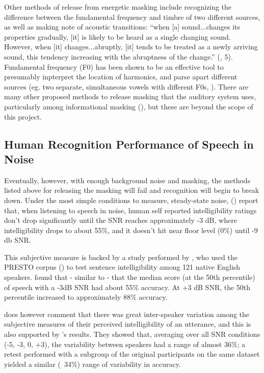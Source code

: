 \documentclass[dissertation,copyright]{uathesis}
\begin{document}
Other methods of release from energetic masking include recognizing the difference between the fundamental frequency and timbre of two different sources, as well as making note of acoustic transitions: ``when [a] sound...changes its properties gradually, [it] is likely to be heard as a single changing sound.  However, when [it] changes...abruptly, [it] tends to be treated as a newly arriving sound, this tendency increasing with the abruptness of the change.'' (\cite{bregman:94}, 5).  Fundamental frequency (F0) has been shown to be an effective tool to presumably inpterpret the location of harmonics, and parse apart different sources (eg. two separate, simultaneous vowels with different F0s, \cite{bird:98}). There are many other proposed methods to release masking that the auditory system uses, particularly among informational masking (\cite{middlebrooks:17}), but these are beyond the scope of this project.


\subsection{Human Recognition Performance of Speech in Noise}

Eventually, however, with enough background noise and masking, the methods listed above for releasing the masking will fail and recognition will begin to break down.  Under the most simple conditions to measure, steady-state noise, (\cite{ding:13}) report that, when listening to speech in noise, human self reported intelligibility ratings don't drop significantly until the SNR reaches approximately -3 dB, where intelligibility drops to about 55\%, and it doesn't hit near floor level (0\%) until -9 db SNR.

This subjective measure is backed by a study performed by \cite{gilbert:13}, who used the PRESTO corpus (\cite{garofolo:93}) to test sentence intelligibility among 121 native English speakers.  \cite{gilbert:13} found that - similar to \cite{ding:13} - that the median score (at the 50th percentile) of speech with a -3dB SNR had about 55\% accuracy.  At +3 dB SNR, the 50th percentile increased to approximately 88\% accuracy.

\cite{ding:13} does however comment that there was great inter-speaker variation among the subjective measures of their perceived intelligibility of an utterance, and this is also supported by \cite{gilbert:13}'s results. They showed that, averaging over all SNR conditions (-5, -3, 0, +3), the variability between speakers had a range of almost 36\%; a retest performed with a subgroup of the original participants on the same dataset yielded a similar (~34\%) range of variability in accuracy.  
\end{document}
